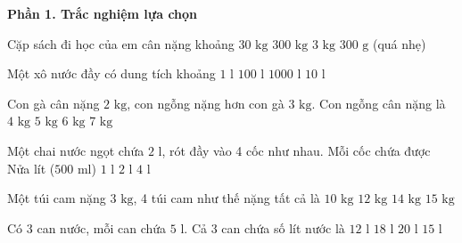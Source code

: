 \textbf{Phần 1. Trắc nghiệm lựa chọn}

\begin{ex} %
Cặp sách đi học của em cân nặng khoảng
\choice
{$30\text{ kg}$}
{$300\text{ kg}$}
{\True $3\text{ kg}$}
{$300\text{ g}$ (quá nhẹ)}
\end{ex}

\begin{ex} %
Một xô nước đầy có dung tích khoảng
\choice
{$1\text{ l}$}
{$100\text{ l}$}
{$1000\text{ l}$}
{\True $10\text{ l}$}
\end{ex}

\begin{ex} %
Con gà cân nặng $2\text{ kg}$, con ngỗng nặng hơn con gà $3\text{ kg}$. Con ngỗng cân nặng là
\choice
{$4\text{ kg}$}
{\True $5\text{ kg}$}
{$6\text{ kg}$}
{$7\text{ kg}$}
\end{ex}

\begin{ex} %
Một chai nước ngọt chứa $2\text{ l}$, rót đầy vào 4 cốc như nhau. Mỗi cốc chứa được
\choice
{\True Nửa lít ($500\text{ ml}$)}
{$1\text{ l}$}
{$2\text{ l}$}
{$4\text{ l}$}
\end{ex}

\begin{ex} %
Một túi cam nặng $3\text{ kg}$, 4 túi cam như thế nặng tất cả là
\choice
{$10\text{ kg}$}
{\True $12\text{ kg}$}
{$14\text{ kg}$}
{$15\text{ kg}$}
\end{ex}

\begin{ex} %
Có 3 can nước, mỗi can chứa $5\text{ l}$. Cả 3 can chứa số lít nước là
\choice
{$12\text{ l}$}
{$18\text{ l}$}
{$20\text{ l}$}
{\True $15\text{ l}$}
\end{ex}

